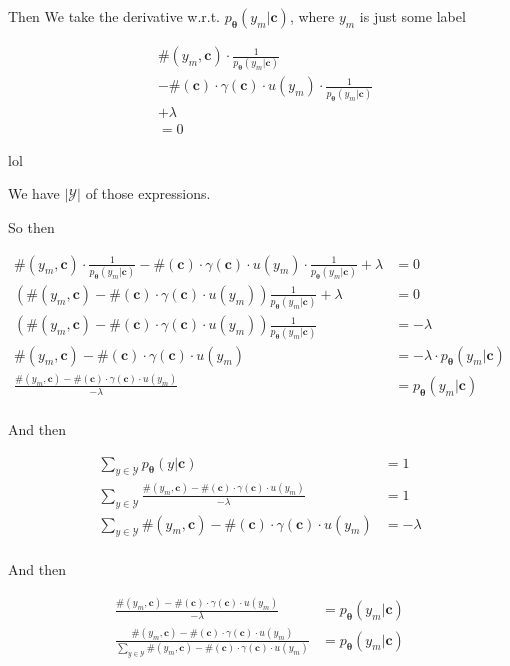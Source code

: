 \documentclass{article}
\newcommand{\vtheta}{\boldsymbol{\theta}}
\newcommand{\model}{p_{\vtheta}}
\newcommand{\context}{\boldsymbol{c}}
\begin{document}
		Then We take the derivative w.r.t. $\model(y_m|\context)$, where $y_m$ is just some label
		
		\begin{align}
			&\#(y_m, \context)\cdot  \frac{1}{\model(y_m|\context)} 	 \\
			&- \#(\context)\cdot \gamma(\context)\cdot u(y_m)\cdot\frac{1}{\model(y_m|\context)} \\
			&+ \lambda \\
			&=0
		\end{align}	
		
		lol
		
		We have $|\mathcal{Y}|$ of those expressions. 
		
		So then 
		
		\begin{align}
			\#(y_m, \context)\cdot  \frac{1}{\model(y_m|\context)} - \#(\context)\cdot \gamma(\context)\cdot u(y_m)\cdot\frac{1}{\model(y_m|\context)} + \lambda &= 0\\
			(\#(y_m, \context) - \#(\context)\cdot \gamma(\context)\cdot u(y_m))   \frac{1}{\model(y_m|\context)} + \lambda &= 0\\
			(\#(y_m, \context) - \#(\context)\cdot \gamma(\context)\cdot u(y_m))   \frac{1}{\model(y_m|\context)} &= - \lambda \\
			\#(y_m, \context) - \#(\context)\cdot \gamma(\context)\cdot u(y_m)  &= - \lambda\cdot \model(y_m|\context) \\
			\frac{\#(y_m, \context) - \#(\context)\cdot \gamma(\context)\cdot u(y_m)}{-\lambda}  &=  \model(y_m|\context) \\
		\end{align}	
		
		And then
		
		\begin{align}
			\sum_{y\in\mathcal{Y}} \model(y|\context) &= 1\\
			\sum_{y\in\mathcal{Y}} \frac{\#(y_m, \context) - \#(\context)\cdot \gamma(\context)\cdot u(y_m)}{-\lambda} &= 1\\
			  \sum_{y\in\mathcal{Y}} \#(y_m, \context) - \#(\context)\cdot \gamma(\context)\cdot u(y_m) &= -\lambda\\
		\end{align}
		
		And then
		
		\begin{align}
			\frac{\#(y_m, \context) - \#(\context)\cdot \gamma(\context)\cdot u(y_m)}{-\lambda}  &=  \model(y_m|\context) \\
			\frac{\#(y_m, \context) - \#(\context)\cdot \gamma(\context)\cdot u(y_m)}{\sum_{y\in\mathcal{Y}} \#(y_m, \context) - \#(\context)\cdot \gamma(\context)\cdot u(y_m)}  &=  \model(y_m|\context)
		\end{align}
		
\end{document}
